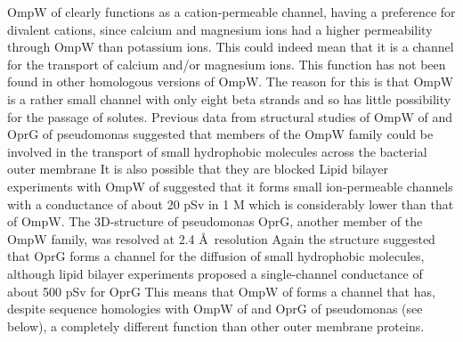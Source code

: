 OmpW of \caulobacter clearly functions as a cation-permeable channel, having a
preference for divalent cations, since calcium and magnesium ions had a higher
permeability through OmpW than potassium ions. This could indeed mean that it is
a channel for the transport of calcium and/or magnesium ions. This function has
not been found in other homologous versions of OmpW. The reason for this is that OmpW is a rather small channel with only eight beta strands and so has little possibility for the passage of solutes. Previous data from structural studies of OmpW of \ecoli and OprG of \ac{pseudomonas} suggested that members of the OmpW family could be involved in the transport of small hydrophobic molecules across the bacterial outer membrane It is also possible that they are blocked Lipid bilayer experiments with OmpW of \ecoli suggested that it forms small ion-permeable channels with a conductance of about 20 \si{\pico\sievert} in 1 M  which is considerably lower than that of \caulobacter OmpW. The 3D-structure of \ac{pseudomonas} OprG, another member of the OmpW family, was resolved at 2.4 \AA~resolution Again the structure suggested that OprG forms a channel for the diffusion of small hydrophobic molecules, although lipid bilayer experiments proposed a single-channel conductance of about 500 \si{\pico\sievert} for OprG This means that OmpW of \caulobacter forms a channel that has, despite sequence homologies with OmpW of \ecoli and OprG of \ac{pseudomonas} (see below), a completely different function than other outer membrane proteins.

